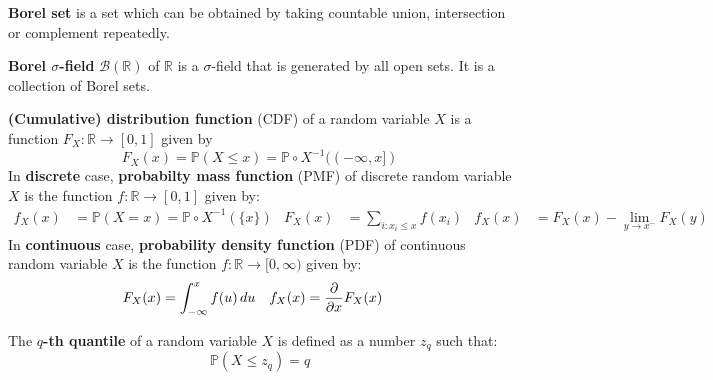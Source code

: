 \documentclass{huhtakm-template-book}
\newcommand{\prob}{\mathbb{P}}
\begin{document}
\begin{sdefn}
	\textbf{Borel set} is a set which can be obtained by taking countable union, intersection or complement repeatedly.
\end{sdefn}
\begin{sdefn}
	\textbf{Borel $\sigma$-field} $\mathcal{B}(\mathbb{R})$ of $\mathbb{R}$ is a $\sigma$-field that is generated by all open sets. It is a collection of Borel sets.
\end{sdefn}
\begin{sdefn}
	\textbf{(Cumulative) distribution function} (CDF) of a random variable $X$ is a function $F_{X}:\mathbb{R}\to[0,1]$ given by
	\begin{equation*}
		F_{X}(x)=\prob(X\leq x)=\prob\circ X^{-1}((-\infty,x])
	\end{equation*}
	In \textbf{discrete} case, \textbf{probabilty mass function} (PMF) of discrete random variable $X$ is the function $f:\mathbb{R}\to[0,1]$ given by:
	\begin{align*}
		f_{X}(x)&=\prob(X=x)=\prob\circ X^{-1}(\{x\}) & F_{X}(x)&=\sum_{i:x_{i}\leq x}f(x_{i}) & f_{X}(x)&=F_{X}(x)-\lim_{y\to x^{-}}F_{X}(y)
	\end{align*}
	In \textbf{continuous} case, \textbf{probability density function} (PDF) of continuous random variable $X$ is the function $f:\mathbb{R}\to[0,\infty)$ given by:
	\begin{align*}
		F_{X}(x)&=\int_{-\infty}^{x}f(u)\,du & f_{X}(x)&=\pdv*{F_{X}(x)}{x}
	\end{align*}
\end{sdefn}
\begin{sdefn}
	The \textbf{$q$-th quantile} of a random variable $X$ is defined as a number $z_{q}$ such that:
	\begin{equation*}
		\prob(X\leq z_{q})=q
	\end{equation*}
\end{sdefn}
\end{document}
